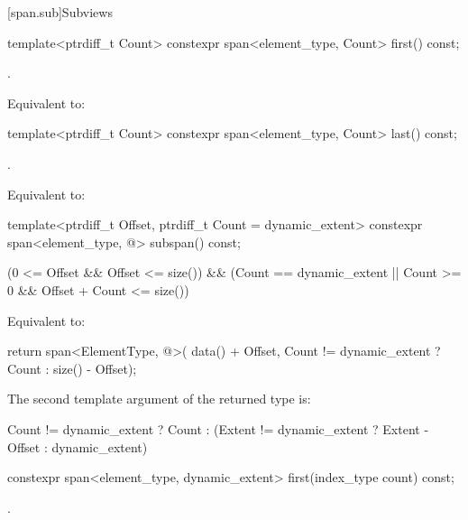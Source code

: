 \begin{codeblock}
\begin{codeblock}
\begin{codeblock}
[span.sub]{Subviews}

%
\begin{itemdecl}
template<ptrdiff_t Count> constexpr span<element_type, Count> first() const;
\end{itemdecl}
\begin{itemdescr}
\pnum
\requires
{}.

\pnum
\effects
Equivalent to: 
\end{itemdescr}

%
\begin{itemdecl}
template<ptrdiff_t Count> constexpr span<element_type, Count> last() const;
\end{itemdecl}
\begin{itemdescr}
\pnum
\requires
{}.

\pnum
\effects
Equivalent to: 
\end{itemdescr}

%
\begin{itemdecl}
template<ptrdiff_t Offset, ptrdiff_t Count = dynamic_extent>
  constexpr span<element_type, @\seebelow@> subspan() const;
\end{itemdecl}
\begin{itemdescr}
\pnum
\requires
\begin{codeblock}
(0 <= Offset && Offset <= size())
&& (Count == dynamic_extent || Count >= 0 && Offset + Count <= size())
\end{codeblock}

\pnum
\effects
Equivalent to:
\begin{codeblock}
return span<ElementType, @\seebelow@>(
  data() + Offset, Count != dynamic_extent ? Count : size() - Offset);
\end{codeblock}

\pnum
\remarks
The second template argument of the returned  type is:
\begin{codeblock}
Count != dynamic_extent ? Count
                        : (Extent != dynamic_extent ? Extent - Offset
                                                    : dynamic_extent)
\end{codeblock}
\end{itemdescr}

%
\begin{itemdecl}
constexpr span<element_type, dynamic_extent> first(index_type count) const;
\end{itemdecl}
\begin{itemdescr}
\pnum
\requires
{}.


\end{itemdescr}
\end{codeblock}
\end{codeblock}
\end{codeblock}
